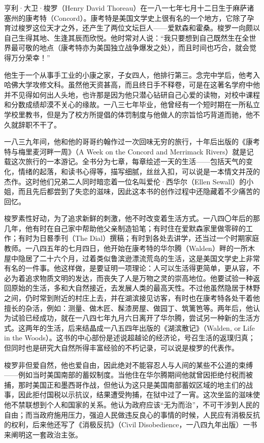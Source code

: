 \par 亨利·大卫·梭罗（Henry David Thoreau）在一八一七年七月十二日生于麻萨诸塞州的康考特（Concord）。康考特是美国文学史上很有名的一个地方，它除了孕育过梭罗这位天才之外，还产生了两位文坛巨人——爱默森和霍桑。梭罗一向颇以自己生得其地、生逢其辰而欣悦。他时常对人说：“我只要想到自己既然生在全世界最可敬的地点（康考特亦为美国独立战争爆发之处），而且时间也巧合，就会觉得万分荣幸！”
\par 他生于一个从事手工业的小康之家，子女四人，他排行第三。念完中学后，他考入哈佛大学攻修文科。虽然他天资甚高，而且终日手不释卷，可是在这著名学府中他并不见得如何出人头地，也许那是因为他只潜心钻研自己心爱的读物，对校中课程和分数成绩却漠不关心的缘故。一八三七年毕业，他曾经有一个短时期在一所私立学校里教书，但是为了校方所提倡的体罚制度与他做人的宗旨恰巧背道而驰，他不久就辞职不干了。
\par 一八三九年间，他和他的哥哥约翰作过一次回味无穷的旅行，十年后出版的《康考特与梅里麦河畔一周》（A Week on the Concord and Merrimack Rivers）就是记载这次旅行的一本游记。全书分为七章，每章绘述一天的生活——包括天气的变化，情绪的起落，和读书心得等，描写细腻，丝丝入扣，可以说是一本情文并茂的杰作。这时他们兄弟二人同时暗恋着一位名叫爱伦·西华尔（Ellen Sewall）的小姐，而且先后都尝到了失恋的滋味，因此这本书的创作过程中还隐藏着不少痛苦的回忆。
\par 梭罗素性好动，为了追求新鲜的刺激，他不时改变着生活方式。一八四〇年后的那几年，他有时在自己家中帮助他父亲制造铅笔；有时住在爱默森家里做零碎的工作；有时为日晷季刊（The Dial）撰稿；有时到各处去讲学，还当过一个时期家庭教师。一八四五年的七月四日，他开始在康考特的华尔腾（Walden）畔的一所木屋中隐居了二十六个月，过着类似鲁滨逊漂流荒岛的生活，这是美国文学史上非常有名的一件事。他这样做，是要证明一项理论：人可以生活得更简单，更从容，不必为着追求物质文明的发达，而丧失了人是万物之灵的崇高地位。他要试验一种返回原始的生活，多和大自然接近，去发展人类的最高天性。不过他虽然隐居于林野之间，仍时常到附近的村庄上去，并在湖滨接见访客，有时也在康考特各处干着他擅长的杂活，例如：测量、做木匠、髹漆房屋、做园丁、筑篱笆等。两年后，他认为试验已经成功，就在一八四七年九月六日离开了华尔腾，尝试另一种新的生活方式。这两年的生活，后来结晶成一八五四年出版的《湖滨散记》（Walden, or Life in the Woods）。这书的中心部份是述说超越论的经济论，号召生活的返璞归真；但同时也是研究大自然所得丰富经验的不朽记录，可以说是梭罗的代表作。
\par 梭罗非但爱自然，他也爱自由，因此绝对不能容忍人与人间的某些不公道的束缚——例如当时美国南部的蓄奴制度。当他住在华尔腾期间他就曾因拒绝付税而被捕，那时美国正和墨西哥作战，但他认为这只是美国南部蓄奴区域的地主们的战事，因此拒付国税以示抗议，结果遭受拘捕，在狱中过了一宵。这次坐监的滋味使他不禁联想到个人和国家的关系。他认为政府应该“无为而治”，不可干涉到人民的自由；而当政府施用压力，强迫人民做违反良心的事情的时候，人民应有消极反抗的权利，后来他还写了《消极反抗》（Civil Disobedience，一八四九年出版）一书来阐明这一套政治主张。
